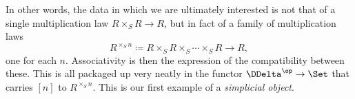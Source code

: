 In other words, the data in which we are ultimately interested is not that of a single multiplication law $R \times_S R \to R$, but in fact of a family of multiplication laws
\[
  R^{\times_S n} \coloneq R \times_S R \times_S \cdots \times_S R \to R \comma
\]
one for each $n$.
Associativity is then the expression of the compatibility between these.
This is all packaged up very neatly in the functor $\DDelta^{\op} \to \Set$ that carries $[n]$ to $R^{\times_S n}$. 
This is our first example of a \emph{simplicial object}.


